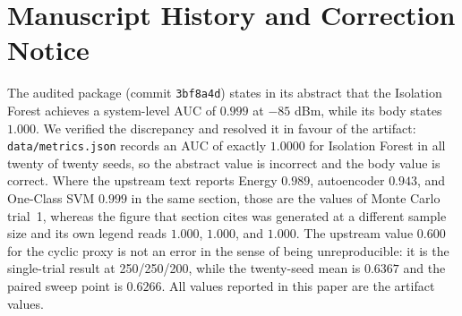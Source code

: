 \documentclass[conference]{IEEEtran}
\newcommand{\Artifact}{\texttt{data/\allowbreak metrics.json}}
\begin{document}
\section*{Manuscript History and Correction Notice}
The audited package (commit \texttt{3bf8a4d}) states in its abstract that the Isolation Forest achieves a system-level AUC of $0.999$ at $-85$ dBm, while its body states $1.000$. We verified the discrepancy and resolved it in favour of the artifact: \Artifact{} records an AUC of exactly $1.0000$ for Isolation Forest in all twenty of twenty seeds, so the abstract value is incorrect and the body value is correct. Where the upstream text reports Energy $0.989$, autoencoder $0.943$, and One-Class SVM $0.999$ in the same section, those are the values of Monte Carlo trial~1, whereas the figure that section cites was generated at a different sample size and its own legend reads $1.000$, $1.000$, and $1.000$. The upstream value $0.600$ for the cyclic proxy is not an error in the sense of being unreproducible: it is the single-trial result at 250/250/200, while the twenty-seed mean is $0.6367$ and the paired sweep point is $0.6266$. All values reported in this paper are the artifact values.
\end{document}
